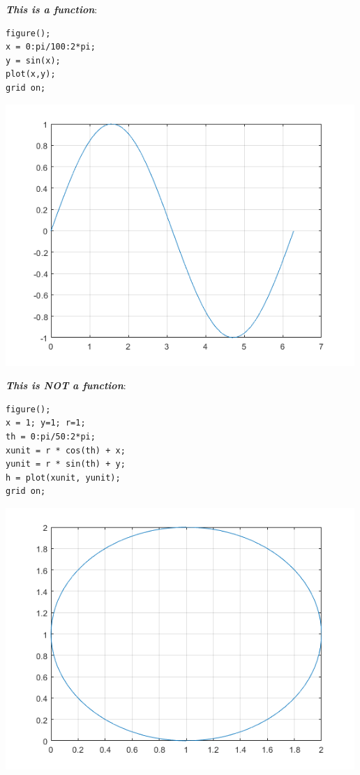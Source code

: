\documentclass[
]{book}
\begin{document}
\textbf{\emph{This is a function}}:

\begin{verbatim}
figure();
x = 0:pi/100:2*pi;
y = sin(x);
plot(x,y);
grid on;
\end{verbatim}

\includegraphics[width=5.20833in,height=\textheight]{img/whatisfunction_images/figure_0.png}

\textbf{\emph{This is NOT a function}}:

\begin{verbatim}
figure();
x = 1; y=1; r=1;
th = 0:pi/50:2*pi;
xunit = r * cos(th) + x;
yunit = r * sin(th) + y;
h = plot(xunit, yunit);
grid on;
\end{verbatim}

\includegraphics[width=5.20833in,height=\textheight]{img/whatisfunction_images/figure_1.png}
\end{document}
